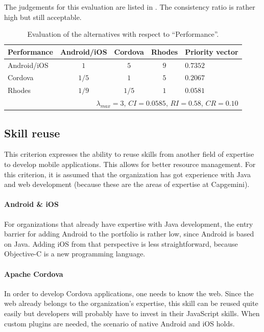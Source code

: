 The judgements for this evaluation are listed in . The consistency ratio is rather high but still acceptable.

\begin{table}[h!]
    \centering
    \begin{tabular}{lcccl}
        \hline
        \textbf{Performance} & Android/iOS & Cordova & Rhodes & Priority vector \\
        \hline
        Android/iOS          & $1$         & $5$     & $9$    & $0.7352$        \\
        Cordova              & $1/5$       & $1$     & $5$    & $0.2067$        \\
        Rhodes               & $1/9$       & $1/5$   & $1$    & $0.0581$        \\
        \hline
        \multicolumn{5}{r}{$\lambda_{max} = 3$, $CI = 0.0585$, $RI = 0.58$, $CR = 0.10$}\\
        \hline
    \end{tabular}
    \caption{Evaluation of the alternatives with respect to ``Performance''.}
    \label{tab:performance}
\end{table}

\subsection{Skill reuse}

This criterion expresses the ability to reuse skills from another field of expertise to develop mobile applications. This allows for better resource management. For this criterion, it is assumed that the organization has got experience with Java and web development (because these are the areas of expertise at Capgemini). 

\paragraph{Android \& iOS} For organizations that already have expertise with Java development, the entry barrier for adding Android to the portfolio is rather low, since Android is based on Java. Adding iOS from that perspective is less straightforward, because Objective-C is a new programming language.

\paragraph{Apache Cordova} In order to develop Cordova applications, one needs to know the web. Since the web already belongs to the organization's expertise, this skill can be reused quite easily but developers will probably have to invest in their JavaScript skills. When custom plugins are needed, the scenario of native Android and iOS holds.

